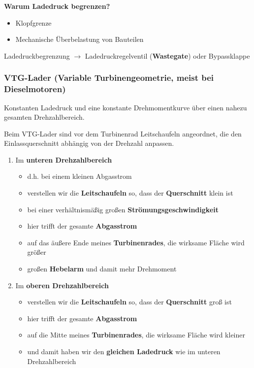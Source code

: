 \textbf{Warum Ladedruck begrenzen?}

\begin{itemize}
\item
  Klopfgrenze
\item
  Mechanische Überbelastung von Bauteilen
\end{itemize}

Ladedruckbegrenzung $\to$ Ladedruckregelventil (\textbf{Wastegate})
oder Bypassklappe

\subsubsection{VTG-Lader (Variable Turbinengeometrie, meist bei
Dieselmotoren)}\label{vtg-lader-variable-turbinengeometrie-meist-bei-dieselmotoren}

Konstanten Ladedruck und eine konstante Drehmomentkurve über einen
nahezu gesamten Drehzahlbereich.

Beim VTG-Lader sind vor dem Turbinenrad Leitschaufeln angeordnet, die
den Einlassquerschnitt abhängig von der Drehzahl anpassen.

\begin{enumerate}
\item
  Im \textbf{unteren Drehzahlbereich}

  \begin{itemize}
  \item
    d.h. bei einem kleinen Abgasstrom
  \item
    verstellen wir die \textbf{Leitschaufeln} so, dass der
    \textbf{Querschnitt} klein ist
  \item
    bei einer verhältnismäßig großen \textbf{Strömungsgeschwindigkeit}
  \item
    hier trifft der gesamte \textbf{Abgasstrom}
  \item
    auf das äußere Ende meines \textbf{Turbinenrades}, die wirksame
    Fläche wird größer
  \item
    großen \textbf{Hebelarm} und damit mehr Drehmoment
  \end{itemize}
\item
  Im \textbf{oberen Drehzahlbereich}

  \begin{itemize}
  \item
    verstellen wir die \textbf{Leitschaufeln} so, dass der
    \textbf{Querschnitt} groß ist
  \item
    hier trifft der gesamte \textbf{Abgasstrom}
  \item
    auf die Mitte meines \textbf{Turbinenrades}, die wirksame Fläche
    wird kleiner
  \item
    und damit haben wir den \textbf{gleichen Ladedruck} wie im unteren
    Drehzahlbereich
  \end{itemize}
\end{enumerate}

